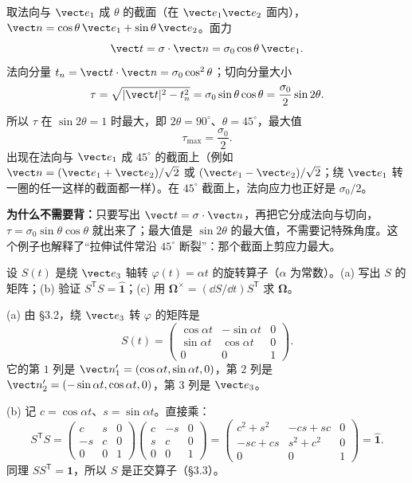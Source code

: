 \documentclass[11pt]{ctexart}
\newcommand{\ten}[1]{\mathbf{#1}}
\newcommand{\unitd}{\hat{\ten{1}}}
\begin{document}
取法向与 $\vect e_1$ 成 $\theta$ 的截面（在 $\vect e_1\vect e_2$ 面内），$\vect n=\cos\theta\,\vect e_1+\sin\theta\,\vect e_2$。面力
\[
\vect t=\ten\sigma\cdot\vect n=\sigma_0\cos\theta\,\vect e_1 .
\]
法向分量 $t_n=\vect t\cdot\vect n=\sigma_0\cos^2\theta$；切向分量大小
\[
\tau=\sqrt{|\vect t|^2-t_n^2}
=\sigma_0\sin\theta\cos\theta
=\frac{\sigma_0}{2}\sin2\theta .
\]
所以 $\tau$ 在 $\sin2\theta=1$ 时最大，即 $2\theta=90^\circ$、$\theta=45^\circ$，最大值
\[
\tau_{\max}=\frac{\sigma_0}{2}.
\]
出现在法向与 $\vect e_1$ 成 $45^\circ$ 的截面上（例如 $\vect n=(\vect e_1+\vect e_2)/\sqrt2$ 或 $(\vect e_1-\vect e_2)/\sqrt2$；绕 $\vect e_1$ 转一圈的任一这样的截面都一样）。在 $45^\circ$ 截面上，法向应力也正好是 $\sigma_0/2$。

\textbf{为什么不需要背：}只要写出 $\vect t=\ten\sigma\cdot\vect n$，再把它分成法向与切向，$\tau=\sigma_0\sin\theta\cos\theta$ 就出来了；最大值是 $\sin2\theta$ 的最大值，不需要记特殊角度。这个例子也解释了“拉伸试件常沿 $45^\circ$ 断裂”：那个截面上剪应力最大。

{设 $S(t)$ 是绕 $\vect e_3$ 轴转 $\varphi(t)=\alpha t$ 的旋转算子（$\alpha$ 为常数）。(a) 写出 $S$ 的矩阵；(b) 验证 $S^{\mathsf T}S=\unitd$；(c) 用 $\boldsymbol\Omega^{\times}=(\dd S/\dd t)S^{\mathsf T}$ 求 $\boldsymbol\Omega$。}

(a) 由 §3.2，绕 $\vect e_3$ 转 $\varphi$ 的矩阵是
\[
S(t)=
\begin{pmatrix}
\cos\alpha t&-\sin\alpha t&0\\
\sin\alpha t&\cos\alpha t&0\\
0&0&1
\end{pmatrix}.
\]
它的第 $1$ 列是 $\vect n'_1=(\cos\alpha t,\sin\alpha t,0)$，第 $2$ 列是 $\vect n'_2=(-\sin\alpha t,\cos\alpha t,0)$，第 $3$ 列是 $\vect e_3$。

(b) 记 $c=\cos\alpha t$、$s=\sin\alpha t$。直接乘：
\[
S^{\mathsf T}S=
\begin{pmatrix}
c&s&0\\-s&c&0\\0&0&1
\end{pmatrix}
\begin{pmatrix}
c&-s&0\\s&c&0\\0&0&1
\end{pmatrix}
=
\begin{pmatrix}
c^2+s^2&-cs+sc&0\\
-sc+cs&s^2+c^2&0\\
0&0&1
\end{pmatrix}
=\unitd .
\]
同理 $SS^{\mathsf T}=\unitd$，所以 $S$ 是正交算子（§3.3）。
\end{document}
